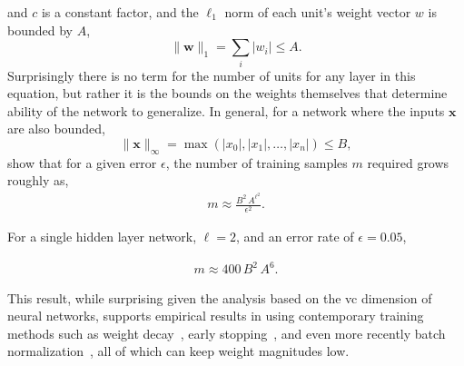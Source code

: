 \documentclass[thesis]{subfiles}
\begin{document}
    and $c$ is a constant factor, and the $\ell_1$ norm of each unit's weight vector $w$ is bounded by $A$, 
    \begin{equation}
    \|\mathbf{w}\|_1 = \sum_i | w_i | \leq A.
    \end{equation}
    Surprisingly there is no term for the number of units for any layer in this equation, but rather it is the bounds on the weights themselves that determine ability of the network to generalize. In general, for a network where the inputs $\mathbf{x}$ are also bounded,
    \begin{equation}
        \|\mathbf{x}\|_\infty = \max(|x_0|, |x_1|, \ldots, |x_n|) \leq B,
    \end{equation}
    \citet{bartlett1997} show that for a given error $\epsilon$, the number of training samples $m$ required grows roughly as,
    \begin{align}
        m \approx \frac{B^2\,A^{\ell^2}}{\epsilon^2}.
    \end{align}
    
     For a single hidden layer network, \ie $\ell=2$, and an error rate of $\epsilon=0.05$, 
    
    \begin{align}
        m \approx 400\,B^2\,A^6.
    \end{align}
    
    This result, while surprising given the analysis based on the \gls{vc} dimension of neural networks, supports empirical results in using contemporary training methods such as weight decay~\citep{hinton1987learning}, early stopping~\citep{Bishop1995}, and even more recently batch normalization~\citep{Ioffe2015}, all of which can keep weight magnitudes low.
    
	
\end{document}
